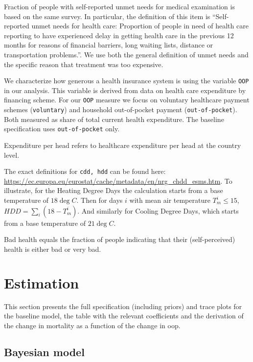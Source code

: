 \documentclass[a4paper,12pt]{article}
\begin{document}
Fraction of people with self-reported unmet needs for medical examination is based on the same survey. In particular, the definition of this item is ``Self-reported unmet needs for health care: Proportion of people in need of health care reporting to have experienced delay in getting health care in the previous 12 months for reasons of financial barriers, long waiting lists, distance or transportation problems.''. We use both the general definition of unmet needs and the specific reason that treatment was too expensive.

We characterize how generous a health insurance system is using the variable \texttt{OOP} in our analysis. This variable is derived from data on health care expenditure by financing scheme. For our \texttt{OOP} measure we focus on voluntary healthcare payment schemes (\texttt{voluntary}) and household out-of-pocket payment (\texttt{out-of-pocket}). Both measured as share of total current health expenditure. The baseline specification uses \texttt{out-of-pocket} only.

Expenditure per head refers to healthcare expenditure per head at the country level.

The exact definitions for \texttt{cdd, hdd} can be found here: \href{https://ec.europa.eu/eurostat/cache/metadata/en/nrg\_chdd\_esms.htm}{https://ec.europa.eu/eurostat/cache/metadata/en/nrg\_chdd\_esms.htm}. To illustrate, for the Heating Degree Days the calculation starts from a base temperature of \(18\deg C\). Then for days \(i\) with mean air temperature \(T_m^{i} \leq 15\), \(HDD = \sum_i (18-T_m^i)\). And similarly for Cooling Degree Days, which starts from a base temperature of \(21 \deg C\).

Bad health equals the fraction of people indicating that their (self-perceived) health is either bad or very bad.


\section{Estimation}
\label{sec:orgc46c9db}
\label{sec:estimation_appendix}



This section presents the full specification (including priors) and trace plots for the baseline model, the table with the relevant coefficients and the derivation of the change in mortality as a function of the change in oop.

\subsection{Bayesian model}
\label{sec:org189e3e7}
\label{sec:Bayesian_model}
\end{document}
